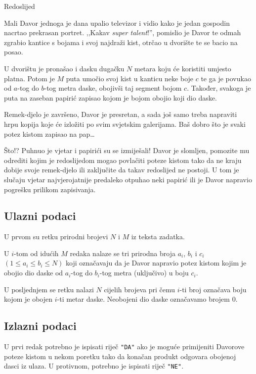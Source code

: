 \begin{statement}[
  problempoints=100,
  timelimit=1 sekunda,
  memorylimit=512 MiB,
]{Redoslijed}

Mali Davor jednoga je dana upalio televizor i vidio kako je jedan gospodin
nacrtao prekrasan portret. ,,Kakav \textit{super talent}!'', pomislio je
Davor te odmah zgrabio kantice s bojama i svoj najdraži kist, otrčao u
dvorište te se bacio na posao.

U dvorištu je pronašao i dasku dugačku $N$ metara koju će koristiti umjesto
platna. Potom je $M$ puta umočio svoj kist u kanticu neke boje $c$ te ga je
povukao od $a$-tog do $b$-tog metra daske, obojivši taj segment bojom $c$.
Također, svakoga je puta na zaseban papirić zapisao kojom je bojom obojio
koji dio daske.

Remek-djelo je završeno, Davor je presretan, a sada još samo treba napraviti
hrpu kopija koje će izložiti po svim svjetskim galerijama. Baš dobro što je
svaki potez kistom zapisao na pap\dots

Što!? Puhnuo je vjetar i papirići su se izmiješali! Davor je slomljen, pomozite
mu odrediti kojim je redoslijedom mogao povlačiti poteze kistom tako da ne
kraju dobije svoje remek-djelo ili zaključite da takav redoslijed ne postoji.
U tom je slučaju vjetar najvjerojatnije predaleko otpuhao neki papirić ili je
Davor napravio pogrešku prilikom zapisivanja.

\subsection*{Ulazni podaci}
U prvom su retku prirodni brojevi $N$ i $M$ iz teksta zadatka.

U $i$-tom od idućih $M$ redaka nalaze se tri prirodna broja $a_i$, $b_i$ i
$c_i$ $(1 \le a_i \le b_i \le N)$ koji označavaju da je Davor napravio potez
kistom kojim je obojio dio daske od $a_i$-tog do $b_i$-tog metra (uključivo)
u boju $c_i$.

U posljednjem se retku nalazi $N$ cijelih brojeva pri čemu $i$-ti broj označava
boju kojom je obojen $i$-ti metar daske. Neobojeni dio daske označavamo brojem
$0$.

\subsection*{Izlazni podaci}
U prvi redak potrebno je ispisati riječ \texttt{"DA"} ako je moguće primijeniti
Davorove poteze kistom u nekom poretku tako da konačan produkt odgovara obojenoj
dasci iz ulaza. U protivnom, potrebno je ispisati riječ \texttt{"NE"}.


\end{statement}
